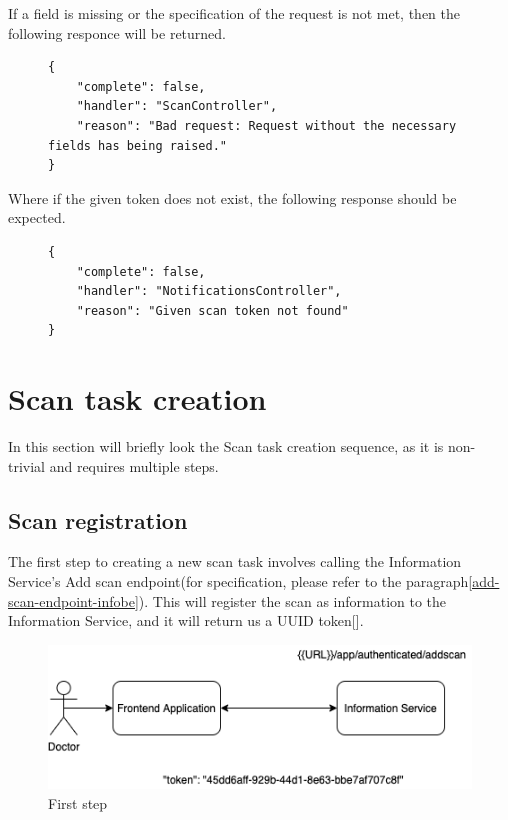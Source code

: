 					If a field is missing or the specification of the request is not met, then the following responce will be returned.
					\begin{figure}[H]
						\iftrue
						\begin{lstlisting}[]
{
	"complete": false,
	"handler": "ScanController",
	"reason": "Bad request: Request without the necessary fields has being raised."
}					
						\end{lstlisting}
					\end{figure}
					Where if the given token does not exist, the following response should be expected.
					\begin{figure}[H]
						\iftrue
						\begin{lstlisting}[]
{
	"complete": false,
	"handler": "NotificationsController",
	"reason": "Given scan token not found"
}		
						\end{lstlisting}
					\end{figure}
	
	\section{Scan task creation}
		\label{scan-creation}
		In this section will briefly look the Scan task creation sequence, as it is non-trivial and requires multiple steps.
		\subsection{Scan registration}
			\label{first-step}
			
			The first step to creating a new scan task involves calling the Information Service's Add scan endpoint(for specification, 
			please refer to the paragraph\ref{add-scan-endpoint-infobe}). This will register the scan as information to the Information 
			Service, and it will return us a UUID token[\cite{rfc4122}].

			\begin{figure}[H]
				\iftrue
				\caption{First step}
				\centering
				\includegraphics[scale=0.6]{figures/sca-creation-sequence-1-Page-2}
				\fi
			\end{figure}
